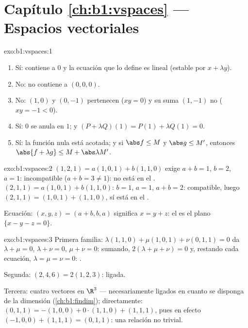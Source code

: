 \section*{Capítulo \ref{ch:b1:vspaces} --- Espacios vectoriales}

\begin{solution}{exo:b1:vspaces:1}
\begin{enumerate}
  \item Sí: contiene a $0$ y la ecuación que lo define es lineal
        (estable por $x + \lambda y$).
  \item No: no contiene a $(0,0,0)$.
  \item No: $(1, 0)$ y $(0, -1)$ pertenecen ($xy = 0$) y su suma
        $(1, -1)$ no ($xy = -1 < 0$).
  \item Sí: $0$ se anula en $1$; y
        $(P + \lambda Q)(1) = P(1) + \lambda Q(1) = 0$.
  \item Sí: la función nula está acotada; y si $\abs f \leq M$ y
        $\abs g \leq M'$, entonces
        $\abs{f + \lambda g} \leq M + \abs\lambda M'$.
\end{enumerate}
\end{solution}

\begin{solution}{exo:b1:vspaces:2}
$(1,2,1) = a(1,0,1) + b(1,1,0)$ exige $a + b = 1$, $b = 2$, $a = 1$:
incompatible ($a + b = 3 \neq 1$): no está en el . $(2,1,1) = a(1,0,1) + b(1,1,0)$: $b = 1$, $a = 1$,
$a + b = 2$: compatible, luego $(2,1,1) = (1,0,1) + (1,1,0)$, sí está
en el .

Ecuación: $(x, y, z) = (a + b, b, a)$ significa $x = y + z$: el
 es el plano $\{x - y - z = 0\}$.
\end{solution}

\begin{solution}{exo:b1:vspaces:3}
Primera familia: $\lambda(1,1,0) + \mu(1,0,1) + \nu(0,1,1) = 0$ da
$\lambda + \mu = 0$, $\lambda + \nu = 0$, $\mu + \nu = 0$: sumando,
$2(\lambda + \mu + \nu) = 0$ y, restando cada ecuación,
$\lambda = \mu = \nu = 0$: .

Segunda: $(2,4,6) = 2(1,2,3)$: ligada.

Tercera: cuatro vectores en $\R^3$ --- necesariamente ligados en
cuanto se disponga de la dimensión (\cref{ch:b1:findim});
directamente: $(0,1,1) = -(1,0,0) + 0\cdot(1,1,0) + (1,1,1)$, pues en
efecto $(-1,0,0) + (1,1,1) = (0,1,1)$: una relación no trivial.
\end{solution}

